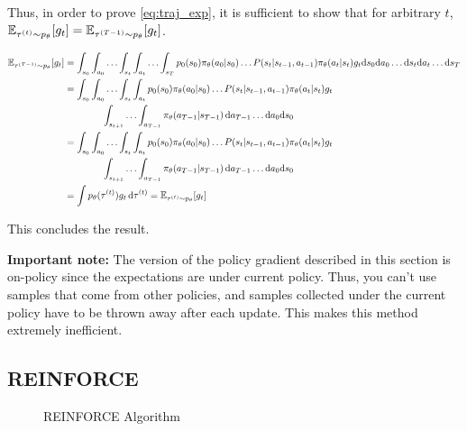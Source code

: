 \documentclass{article}
\begin{document}
\begin{tcolorbox}[breakable,enhanced,colback=gray!10!white,colframe=gray!50!black,
title={Policy Gradient Derivation for $J(\theta) = \sum_{t=0}^{T-1} \BBE_{\tau^{(t)} \sim p_\theta}[r(s_t, a_t)]$}]
Thus, in order to prove \eqref{eq:traj_exp}, it is sufficient to show that for arbitrary $t$, ${\mathbb E}_{\tau^{(t)} \sim p_\theta}[g_t] = {\mathbb E}_{\tau^{(T-1)} \sim p_\theta}[ g_t]$.

\begin{align*}
\BBE_{\tau^{(T-1)} \sim p_\theta} [g_t]&= \int_{s_0} \int_{a_0} \ldots \int_{s_t} \int_{a_t} \ldots \int_{s_T} p_0(s_0) \pi_\theta(a_0 \vert s_0) \ldots P(s_t \vert s_{t-1}, a_{t-1}) \pi_\theta(a_t \vert s_t) g_t \ds_0 \da_0 \ldots \ds_t \da_t \ldots \ds_T \\
% 
&= \int_{s_0} \int_{a_0} \ldots \int_{s_t} \int_{a_t} p_0(s_0) \pi_\theta(a_0 \vert s_0) \ldots P(s_t \vert s_{t-1}, a_{t-1}) \pi_\theta(a_t \vert s_t) g_t  \\
&\qquad\qquad\int_{s_{t+1}}\ldots \int_{a_{T-1}} \pi_\theta(a_{T-1} \vert s_{T-1}) \, \da_{T-1} \ldots \da_0 \ds_0 \\
% 
&= \int_{s_0} \int_{a_0} \ldots \int_{s_t} \int_{a_t} p_0(s_0) \pi_\theta(a_0 \vert s_0) \ldots P(s_t \vert s_{t-1}, a_{t-1}) \pi_\theta(a_t \vert s_t) g_t\\
&\qquad \qquad\int_{s_{t+1}} \ldots \int_{a_{T-1}} \pi_\theta(a_{T-1} \vert s_{T-1}) \, \da_{T-1} \ldots \da_0 \ds_0 \\
% 
&= \int p_\theta(\tau^{(t)}) g_t \, \dtau^{(t)} = \BBE_{\tau^{(t)} \sim p_\theta}[g_t]
\end{align*}

This concludes the result.

\end{tcolorbox}


\begin{tcolorbox}[colback=blue!10!white,colframe=blue!50!black]
\textbf{Important note:}
The version of the policy gradient described in this section is on-policy since the expectations are under current policy. Thus, you can't use samples that come from other policies, and samples collected under the current policy have to be thrown away after each update. This makes this method extremely inefficient.
\end{tcolorbox}


\subsection{REINFORCE}
\begin{figure}[ht]
\caption{REINFORCE Algorithm}\label{fig:reinforce}
\end{figure} 
\end{document}
